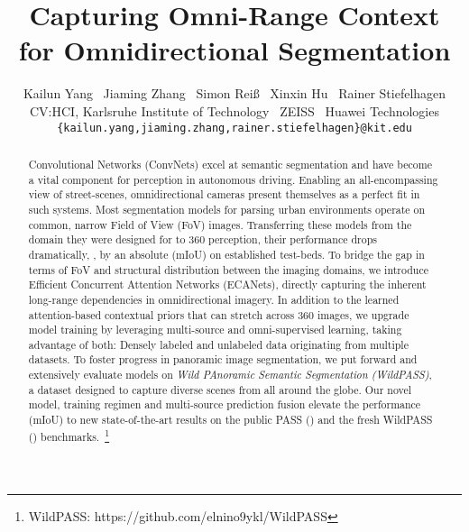 \documentclass[final]{cvpr}
\begin{document}
\title{Capturing Omni-Range Context for Omnidirectional Segmentation}

\author{Kailun Yang
~Jiaming Zhang
~Simon Reiß
~Xinxin Hu
~Rainer Stiefelhagen\\
\normalsize
CV:HCI, Karlsruhe Institute of Technology
\normalsize
~ZEISS
\normalsize
~Huawei Technologies\\
{\tt\small \{kailun.yang,jiaming.zhang,rainer.stiefelhagen\}@kit.edu}
}

\maketitle

\thispagestyle{empty}

\begin{abstract}
Convolutional Networks (ConvNets) excel at semantic segmentation and have become a vital component for perception in autonomous driving. Enabling an all-encompassing view of street-scenes, omnidirectional cameras present themselves as a perfect fit in such systems. Most segmentation models for parsing urban environments operate on common, narrow Field of View (FoV) images. Transferring these models from the domain they were designed for to 360 perception, their performance drops dramatically, \eg, by an absolute  (mIoU) on established test-beds. To bridge the gap in terms of FoV and structural distribution between the imaging domains, we introduce Efficient Concurrent Attention Networks (ECANets), directly capturing the inherent long-range dependencies in omnidirectional imagery. In addition to the learned attention-based contextual priors that can stretch across 360 images, we upgrade model training by leveraging multi-source and omni-supervised learning, taking advantage of both: Densely labeled and unlabeled data originating from multiple datasets. To foster progress in panoramic image segmentation, we put forward and extensively evaluate models on \emph{Wild PAnoramic Semantic Segmentation (WildPASS)}, a dataset designed to capture diverse scenes from all around the globe. Our novel model, training regimen and multi-source prediction fusion elevate the performance (mIoU) to new state-of-the-art results on the public PASS () and the fresh WildPASS () benchmarks.~\footnote[1]{WildPASS: https://github.com/elnino9ykl/WildPASS}
\end{abstract}
\end{document}
